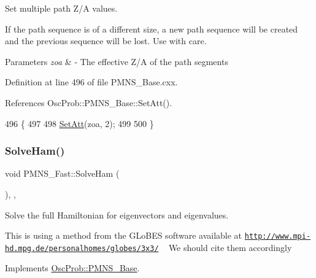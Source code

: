 Set multiple path Z/A values.

If the path sequence is of a different size, a new path sequence will be created and the previous sequence will be lost. Use with care.


\begin{DoxyParams}{Parameters}
{\em zoa} & -\/ The effective Z/A of the path segments \\
\hline
\end{DoxyParams}


Definition at line 496 of file P\+M\+N\+S\+\_\+\+Base.\+cxx.



References Osc\+Prob\+::\+P\+M\+N\+S\+\_\+\+Base\+::\+Set\+Att().


\begin{DoxyCode}
496                                            \{
497 
498   \hyperlink{classOscProb_1_1PMNS__Base_aba565962a440d14bee7a2a96d2eca2c5}{SetAtt}(zoa, 2);
499 
500 \}
\end{DoxyCode}
\mbox{\label{classOscProb_1_1PMNS__Fast_a8a0828401591e88c60e0051fbfe02d5e}} 
\subsubsection{\texorpdfstring{Solve\+Ham()}{SolveHam()}}
{\footnotesize\ttfamily void P\+M\+N\+S\+\_\+\+Fast\+::\+Solve\+Ham (\begin{DoxyParamCaption}{ }\end{DoxyParamCaption})\hspace{0.3cm}{\ttfamily [protected]}, {\ttfamily [virtual]}, {\ttfamily [inherited]}}

Solve the full Hamiltonian for eigenvectors and eigenvalues.

This is using a method from the G\+Lo\+B\+ES software available at \href{http://www.mpi-hd.mpg.de/personalhomes/globes/3x3/}{\tt http\+://www.\+mpi-\/hd.\+mpg.\+de/personalhomes/globes/3x3/} ~\newline
We should cite them accordingly 

Implements \hyperlink{classOscProb_1_1PMNS__Base_a91f065cb9e910e0095e41462b4420b01}{Osc\+Prob\+::\+P\+M\+N\+S\+\_\+\+Base}.



